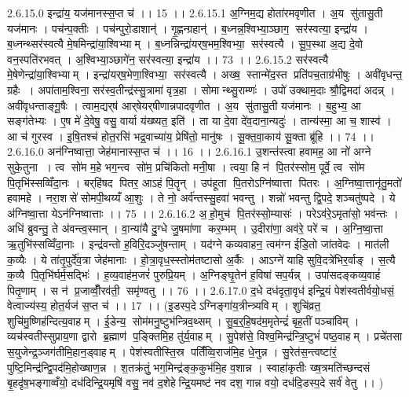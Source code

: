2.6.15.0
इन्द्रा॑य॒ यज॑मानस्स॒प्त च॑ ।। 15 ।।
2.6.15.1
अ॒ग्निम॒द्य होता॑रमवृणीत । अ॒य सु॑तासु॒ती यज॑मानः । पच॑न्प॒क्तीः । पच॑न्पुरो॒डाशान्॑ । गृ॒ह्णन्ग्रहान्॑ । ब॒ध्नन्न॒श्विभ्या॒ञ्छाग॒॒ सर॑स्वत्या॒ इन्द्रा॑य । ब॒ध्नन्थ्सर॑स्वत्यै मे॒षमिन्द्रा॑या॒श्विभ्याम् । ब॒ध्नन्निन्द्रा॑यर्‌ष॒भम॒श्विभ्या॒॒ सर॑स्वत्यै । सू॒प॒स्था अ॒द्य दे॒वो वन॒स्पति॑रभवत् । अ॒श्विभ्या॒ञ्छागे॑न॒ सर॑स्वत्या॒ इन्द्रा॑य ।। 73 ।।
2.6.15.2
सर॑स्वत्यै मे॒षेणेन्द्रा॑या॒श्विभ्याम् । इन्द्रा॑यर्‌ष॒भेणा॒श्विभ्या॒॒ सर॑स्वत्यै । अख्ष॒॒ स्तान्मे॑द॒स्त प्रति॑पच॒ताग्र॑भीषुः । अवी॑वृधन्त॒ ग्रहैः । अपा॑ताम॒श्विना॒ सर॑स्व॒तीन्द्र॑स्सु॒त्रामा॑ वृत्र॒हा । सोमान्थ्सु॒राम्णः॑ । उपो॑ उक्थाम॒दाः श्रौ॒द्विमदा॑ अदन्न् । अवी॑वृधन्ताङ्गू॒षैः । त्वाम॒द्यर्‌ष॑ आर्‌षेयर्‌षीणान्नपादवृणीत । अ॒य सु॑तासु॒ती यज॑मानः । ब॒हुभ्य॒ आ सङ्ग॑तेभ्यः । ए॒ष मे॑ दे॒वेषु॒ वसु॒ वार्या य॑ख्ष्यत॒ इति॑ । ता या दे॒वा दे॑व॒दाना॒न्यदुः॑ । तान्य॑स्मा॒ आ च॒ शास्व॑ । आ च॑ गुरस्व । इ॒षि॒तश्च॑ होत॒रसि॑ भद्र॒वाच्या॑य॒ प्रेषि॑तो॒ मानु॑षः । सू॒क्त॒वा॒काय॑ सू॒क्ता ब्रू॑हि ।। 74 ।।
2.6.16.0
अन॑ग्निष्वात्ता॒ जेह॑मानास्स॒प्त च॑ ।। 16 ।।
2.6.16.1
उ॒शन्त॑स्त्वा हवामह॒ आ नो॑ अग्ने सुके॒तुना । त्व सो॑म म॒हे भग॒न्त्व सो॑म॒ प्रचि॑कितो मनी॒षा । त्वया॒ हि न॑ पि॒तर॑स्सोम॒ पूर्वे॒ त्व सो॑म पि॒तृभि॑स्सव्विँदा॒नः । बर्‌हि॑षद पितर॒ आऽहं पि॒तॄन् । उप॑हूता पि॒तरोऽग्नि॑ष्वात्ता पितरः । अ॒ग्निष्वा॒त्तानृ॑तु॒मतो॑ हवामहे । नरा॒शसे॑ सोमपी॒थय्यँ आ॒शुः । ते नो॒ अर्व॑न्तस्सु॒हवा॑ भवन्तु । शन्नो॑ भवन्तु द्वि॒पदे॒ शञ्चतु॑ष्पदे । ये अ॑ग्निष्वा॒त्ता येऽन॑ग्निष्वात्ताः ।। 75 ।।
2.6.16.2
अ॒॒हो॒मुच॑ पि॒तर॑स्सो॒म्यासः॑ । परेऽव॑रे॒ऽमृता॑सो॒ भव॑न्तः । अधि॑ ब्रुवन्तु॒ ते अ॑वन्त्व॒स्मान् । वा॒न्या॑यै दु॒ग्धे जु॒षमा॑णा कर॒म्भम् । उ॒दीरा॑णा॒ अव॑रे॒ परे॑ च । अ॒ग्नि॒ष्वा॒त्ता ऋ॒तुभि॑स्सव्विँदा॒नाः । इन्द्र॑वन्तो ह॒विरि॒दञ्जु॑षन्ताम् । यद॑ग्ने कव्यवाहन॒ त्वम॑ग्न ईडि॒तो जा॑तवेदः । मात॑ली क॒व्यैः । ये ता॑तृ॒पुर्दे॑व॒त्रा जेह॑मानाः । हो॒त्रा॒वृध॒स्स्तोम॑तष्टासो अ॒र्कैः । आऽग्ने॑ याहि सुवि॒दत्रे॑भिर॒र्वाङ् । स॒त्यै क॒व्यै पि॒तृभि॑र्घर्म॒सद्भिः॑ । ह॒व्य॒वाह॑म॒जरं॑ पुरुप्रि॒यम् । अ॒ग्निङ्घृ॒तेन॑ ह॒विषा॑ सप॒र्यन्न् । उपा॑सदङ्कव्य॒वाहं॑ पितृ॒णाम् । स न॑ प्र॒जाव्वीँ॒रव॑ती॒॒ समृ॑ण्वतु ।। 76 ।।
2.6.17.0
द॒धे दध॑दृता॒वृध॑ इन्द्रि॒यं पेश॑स्वतीर्वयो॒धसं॒ वेत्वाज्य॑स्य॒ होत॒र्यज॑ स॒प्त च॑ ।। 17 ।। (इ॒डस्प॒देऽग्निङ्गा॑य॒त्रीन्त्र्यविम् । शुचि॑व्रत॒॒ शुचि॑मु॒ष्णिह॑न्दित्य॒वाहम् । ई॒डेन्य॒॒ सोम॑मनु॒ष्टुभ॑न्त्रिव॒थ्सम् । सु॒ब॒र्॒हि॒षद॑म॒मृतेन्द्रं॑ बृह॒तीं पञ्चा॑विम् । व्यच॑स्वतीस्सुप्राय॒णा द्वारो ब्र॒ह्माण॑ प॒ङ्क्तिमि॒ह तु॑र्य॒वाहम् । सु॒पेश॑से॒ विश्व॒मिन्द्र॑न्त्रि॒ष्टुभं॑ पष्ठ॒वाहम् । प्रचे॑तसा स॒युजेन्द्र॒ञ्जग॑तीमि॒हान॒ड्वाहम् । पेश॑स्वतीस्ति॒स्र पतिँ॑व्वि॒राज॑मि॒ह धे॒नुन्न । सु॒रेत॑स॒न्त्वष्टा॑रं॒ पुष्टि॒मिन्द्र॑न्द्वि॒पद॑मि॒होख्षाण॒न्न । श॒तक्र॑तुं॒ भग॒मिन्द्र॑ङ्क॒कुभ॑मि॒ह व॒शान्न । स्वाहा॑कृतीः ख्ष॒त्रमति॑च्छन्दसं बृ॒हदृ॑ष॒भङ्गाव्वँयो॒ दध॑दिन्द्रि॒यमृषि॑ वसु॒ नव॑ द॒शेहेन्द्रि॒यमष्ट॑ नव दश॒ गान्न वयो॒ दध॑दि॒डस्प॒दे सर्व॑ वेतु ।। )
